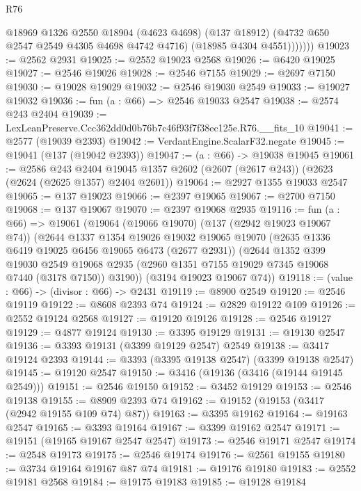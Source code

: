 \begin{lexlean}{R76}
\begin{coremodule}
              @18969
                @1326
                @2550
                @18904
                (@4623 @4698)
                (@137 @18912)
                (@4732 @650 @2547 @2549 @4305 @4698 @4742 @4716)
                (@18985 @4304 @4551)))))))
@19023 := @2562 @2931
@19025 := @2552 @19023 @2568
@19026 := @6420 @19025
@19027 := @2546 @19026
@19028 := @2546 @7155
@19029 := @2697 @7150
@19030 := @19028 @19029
@19032 := @2546 @19030 @2549
@19033 := @19027 @19032
@19036 := fun (a : @66) => @2546 @19033 @2547
@19038 := @2574 @243 @2404
@19039 := LexLeanPreserve.Ccc362dd0d0b76b7c46f93f7f38ec125e.R76.__fits_10
@19041 := @2577 (@19039 @2393)
@19042 := VerdantEngine.ScalarF32.negate
@19045 := @19041 (@137 (@19042 @2393))
@19047 := (a : @66) -> @19038 @19045
@19061 := @2586
    @243
    @2404
    @19045
    @1357
    @2602
    (@2607 (@2617 @243))
    (@2623 (@2624 (@2625 @1357) @2404 @2601))
@19064 := @2927 @1355 @19033 @2547
@19065 := @137 @19023
@19066 := @2397 @19065
@19067 := @2700 @7150
@19068 := @137 @19067
@19070 := @2397 @19068 @2935
@19116 := fun (a : @66) =>
  @19061
    (@19064
      (@19066 @19070)
      (@137 (@2942 @19023 @19067 @74))
      (@2644
        @1337
        @1354
        @19026
        @19032
        @19065
        @19070
        (@2635 @1336 @6419 @19025 @6456 @19065 @6473 (@2677 @2931))
        (@2644
          @1352
          @399
          @19030
          @2549
          @19068
          @2935
          (@2960 @1351 @7155 @19029 @7345 @19068 @7440 (@3178 @7150))
          @3190))
      (@3194 @19023 @19067 @74))
@19118 := (value : @66) -> (divisor : @66) -> @2431
@19119 := @8900 @2549
@19120 := @2546 @19119
@19122 := @8608 @2393 @74
@19124 := @2829 @19122 @109
@19126 := @2552 @19124 @2568
@19127 := @19120 @19126
@19128 := @2546 @19127
@19129 := @4877 @19124
@19130 := @3395 @19129
@19131 := @19130 @2547
@19136 := @3393 @19131 (@3399 @19129 @2547) @2549
@19138 := @3417 @19124 @2393
@19144 := @3393 (@3395 @19138 @2547) (@3399 @19138 @2547)
@19145 := @19120 @2547
@19150 := @3416 (@19136 (@3416 (@19144 @19145 @2549)))
@19151 := @2546 @19150
@19152 := @3452 @19129
@19153 := @2546 @19138
@19155 := @8909 @2393 @74
@19162 := @19152 (@19153 (@3417 (@2942 @19155 @109 @74) @87))
@19163 := @3395 @19162
@19164 := @19163 @2547
@19165 := @3393 @19164
@19167 := @3399 @19162 @2547
@19171 := @19151 (@19165 @19167 @2547 @2547)
@19173 := @2546 @19171 @2547
@19174 := @2548 @19173
@19175 := @2546 @19174
@19176 := @2561 @19155
@19180 := @3734 @19164 @19167 @87 @74
@19181 := @19176 @19180
@19183 := @2552 @19181 @2568
@19184 := @19175 @19183
@19185 := @19128 @19184

\end{coremodule}
\end{lexlean}
